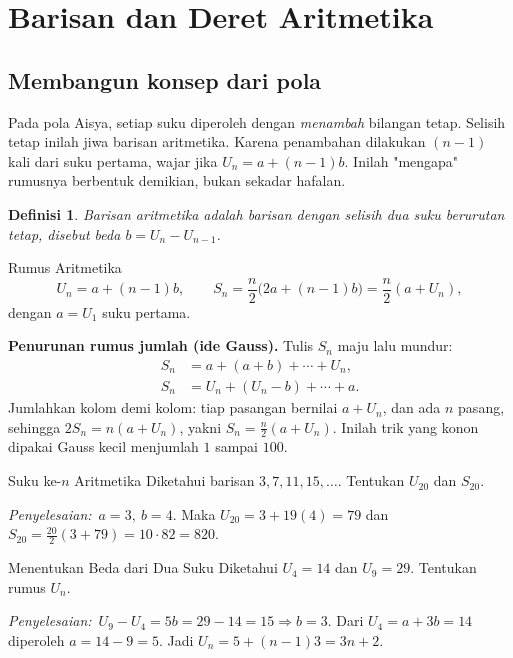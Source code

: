 \documentclass[11pt,a4paper]{report}
\theoremstyle{gaya}
\newtheorem{definisi}{Definisi}[chapter]
\newcommand{\jawab}{\par\smallskip\noindent\textit{\textcolor{oranye}{Penyelesaian:}}\ }
\begin{document}
\section{Barisan dan Deret Aritmetika}

\subsection*{Membangun konsep dari pola}
Pada pola Aisya, setiap suku diperoleh dengan \emph{menambah} bilangan tetap. Selisih tetap inilah jiwa barisan aritmetika. Karena penambahan dilakukan $(n-1)$ kali dari suku pertama, wajar jika $U_n = a+(n-1)b$. Inilah "mengapa" rumusnya berbentuk demikian, bukan sekadar hafalan.

\begin{definisi}
\emph{Barisan aritmetika} adalah barisan dengan selisih dua suku berurutan tetap, disebut \emph{beda} $b = U_n - U_{n-1}$.
\end{definisi}

\begin{konsep}{Rumus Aritmetika}
\[
U_n = a + (n-1)b, \qquad
S_n = \frac{n}{2}\big(2a + (n-1)b\big) = \frac{n}{2}(a + U_n),
\]
dengan $a = U_1$ suku pertama.
\end{konsep}

\textbf{Penurunan rumus jumlah (ide Gauss).} Tulis $S_n$ maju lalu mundur:
\[
\begin{aligned}
S_n &= a + (a+b) + \cdots + U_n,\\
S_n &= U_n + (U_n-b) + \cdots + a.
\end{aligned}
\]
Jumlahkan kolom demi kolom: tiap pasangan bernilai $a+U_n$, dan ada $n$ pasang, sehingga $2S_n=n(a+U_n)$, yakni $S_n=\tfrac n2(a+U_n)$. Inilah trik yang konon dipakai Gauss kecil menjumlah $1$ sampai $100$.

\begin{contoh}{Suku ke-$n$ Aritmetika}
Diketahui barisan $3, 7, 11, 15, \dots$. Tentukan $U_{20}$ dan $S_{20}$.

\jawab $a = 3,\ b = 4$. Maka $U_{20} = 3 + 19(4) = 79$ dan
$S_{20} = \tfrac{20}{2}(3 + 79) = 10 \cdot 82 = 820.$
\end{contoh}

\begin{contoh}{Menentukan Beda dari Dua Suku}
Diketahui $U_4=14$ dan $U_9=29$. Tentukan rumus $U_n$.

\jawab $U_9-U_4=5b=29-14=15\Rightarrow b=3$. Dari $U_4=a+3b=14$ diperoleh $a=14-9=5$. Jadi $U_n=5+(n-1)3=3n+2$.
\end{contoh}
\end{document}

